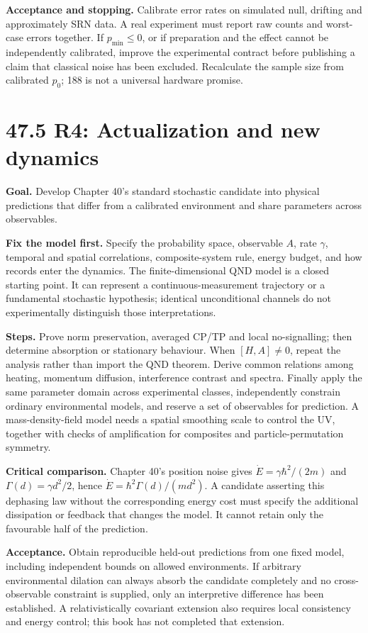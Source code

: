 \documentclass[
  11pt,
  oneside]{book}
\begin{document}
\textbf{Acceptance and stopping.} Calibrate error rates on simulated
null, drifting and approximately SRN data. A real experiment must report
raw counts and worst-case errors together. If \(p_{\min}\le0\), or if
preparation and the effect cannot be independently calibrated, improve
the experimental contract before publishing a claim that classical noise
has been excluded. Recalculate the sample size from calibrated \(p_0\);
188 is not a universal hardware promise.

\section{47.5 R4: Actualization and new dynamics}

\textbf{Goal.} Develop Chapter 40's standard stochastic candidate into
physical predictions that differ from a calibrated environment and share
parameters across observables.

\textbf{Fix the model first.} Specify the probability space, observable
\(A\), rate \(\gamma\), temporal and spatial correlations,
composite-system rule, energy budget, and how records enter the
dynamics. The finite-dimensional QND model is a closed starting point.
It can represent a continuous-measurement trajectory or a fundamental
stochastic hypothesis; identical unconditional channels do not
experimentally distinguish those interpretations.

\textbf{Steps.} Prove norm preservation, averaged CP/TP and local
no-signalling; then determine absorption or stationary behaviour. When
\([H,A]\ne0\), repeat the analysis rather than import the QND theorem.
Derive common relations among heating, momentum diffusion, interference
contrast and spectra. Finally apply the same parameter domain across
experimental classes, independently constrain ordinary environmental
models, and reserve a set of observables for prediction. A
mass-density-field model needs a spatial smoothing scale to control the
UV, together with checks of amplification for composites and
particle-permutation symmetry.

\textbf{Critical comparison.} Chapter 40's position noise gives
\(\dot E=\gamma\hbar^2/(2m)\) and \(\Gamma(d)=\gamma d^2/2\), hence
\(\dot E=\hbar^2\Gamma(d)/(md^2)\). A candidate asserting this dephasing
law without the corresponding energy cost must specify the additional
dissipation or feedback that changes the model. It cannot retain only
the favourable half of the prediction.

\textbf{Acceptance.} Obtain reproducible held-out predictions from one
fixed model, including independent bounds on allowed environments. If
arbitrary environmental dilation can always absorb the candidate
completely and no cross-observable constraint is supplied, only an
interpretive difference has been established. A relativistically
covariant extension also requires local consistency and energy control;
this book has not completed that extension.
\end{document}
